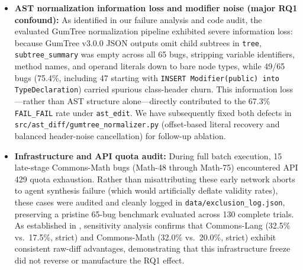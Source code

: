 \documentclass[12pt, a4paper]{article}
\begin{document}
\begin{itemize}[leftmargin=*]
  \item \textbf{AST normalization information loss and modifier noise (major RQ1 confound):} As identified in our failure analysis and code audit, the evaluated GumTree normalization pipeline exhibited severe information loss: because GumTree v3.0.0 JSON outputs omit child subtrees in \texttt{tree}, \texttt{subtree\_summary} was empty across all 65 bugs, stripping variable identifiers, method names, and operand literals down to bare node types, while 49/65 bugs (75.4\%, including 47 starting with \texttt{INSERT Modifier(public) into TypeDeclaration}) carried spurious class-header churn. This information loss---rather than AST structure alone---directly contributed to the 67.3\% \texttt{FAIL\_FAIL} rate under \texttt{ast\_edit}. We have subsequently fixed both defects in \texttt{src/ast\_diff/gumtree\_normalizer.py} (offset-based literal recovery and balanced header-noise cancellation) for follow-up ablation.
  \item \textbf{Infrastructure and API quota audit:} During full batch execution, 15 late-stage Commons-Math bugs (Math-48 through Math-75) encountered API 429 quota exhaustion.
    Rather than misattributing these early network aborts to agent synthesis failure (which would artificially deflate validity rates), these cases were audited and cleanly logged in \texttt{data/exclusion\_log.json}, preserving a pristine 65-bug benchmark evaluated across 130 complete trials.
    As established in , sensitivity analysis confirms that Commons-Lang (32.5\% vs.\ 17.5\%, strict) and Commons-Math (32.0\% vs.\ 20.0\%, strict) exhibit consistent raw-diff advantages, demonstrating that this infrastructure freeze did not reverse or manufacture the RQ1 effect.
\end{itemize}
\end{document}
